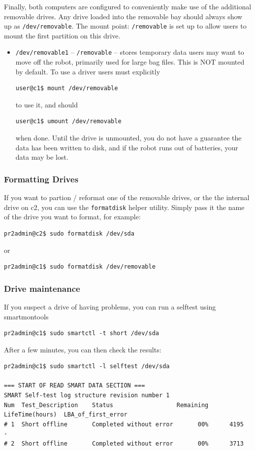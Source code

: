 Finally, both computers are configured to conveniently make use of the
additional removable drives.  Any drive loaded into the removable bay
should always show up as \texttt{/dev/removable}.  The mount point:
\texttt{/removable} is set up to allow users to mount the first
partition on this drive.
\begin{itemize}
\item \texttt{/dev/removable1} -- \texttt{/removable} -- stores
  temporary data users may want to move off the robot, primarily used
  for large bag files.  This is NOT mounted by default.  To use a
  driver users must explicitly
\begin{verbatim}
user@c1$ mount /dev/removable
\end{verbatim}
to use it, and should 
\begin{verbatim}
user@c1$ umount /dev/removable
\end{verbatim}
when done.  Until the drive is unmounted, you do not have a guarantee
the data has been written to disk, and if the robot runs out of
batteries, your data may be lost.
\end{itemize}

\subsubsection{Formatting Drives}
If you want to partion / reformat one of the removable drives, or the
the internal drive on c2, you can use the \texttt{formatdisk} helper
utility.  Simply pass it the name of the drive you want to format, for
example:
\begin{verbatim}
pr2admin@c2$ sudo formatdisk /dev/sda
\end{verbatim}
or
\begin{verbatim}
pr2admin@c1$ sudo formatdisk /dev/removable
\end{verbatim}

\subsubsection{Drive maintenance}
If you suspect a drive of having problems, you can run a selftest using smartmontools

\begin{verbatim}
pr2admin@c1$ sudo smartctl -t short /dev/sda
\end{verbatim}

After a few minutes, you can then check the results:
\begin{verbatim}
pr2admin@c1$ sudo smartctl -l selftest /dev/sda

=== START OF READ SMART DATA SECTION ===
SMART Self-test log structure revision number 1
Num  Test_Description    Status                  Remaining  LifeTime(hours)  LBA_of_first_error
# 1  Short offline       Completed without error       00%      4195         -
# 2  Short offline       Completed without error       00%      3713  
\end{verbatim}

